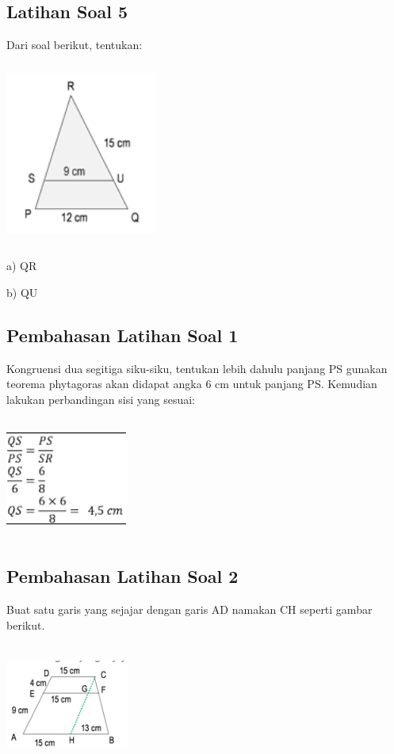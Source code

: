 \documentclass[11pt,fleqn]{book} %
\begin{document}
\subsection{Latihan Soal 5}
Dari soal berikut, tentukan:

\includegraphics[width = 5cm, height= 6cm]{Pictures/a31.png}

a) QR

b) QU

\subsection{Pembahasan Latihan Soal 1}
Kongruensi dua segitiga siku-siku, tentukan lebih dahulu panjang PS gunakan teorema phytagoras akan didapat angka 6 cm untuk panjang PS. Kemudian lakukan perbandingan sisi yang sesuai: 

\includegraphics[width = 4cm, height= 4cm]{Pictures/a32.png}


\subsection{Pembahasan Latihan Soal 2}

Buat satu garis yang sejajar dengan garis AD namakan CH seperti gambar berikut. 

\includegraphics[width = 4cm, height= 4cm]{Pictures/a33.png} 
\end{document}

